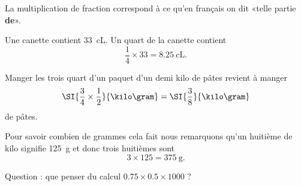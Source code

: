 \begin{Aretenir}
    La multiplication de fraction correspond à ce qu'en français on dit «telle partie {\bf de}».
\end{Aretenir}

\begin{example}
    Une canette contient \SI{33}{\centi\liter}. Un quart de la canette contient
    \begin{equation}
        \frac{1}{ 4 }\times 33 =\SI{8.25}{\centi\liter}.
    \end{equation}
\end{example}

\begin{example}
    Manger les trois quart d'un paquet d'un demi kilo de pâtes revient à manger
    \begin{equation}
        \SI{\frac{ 3 }{ 4 }\times \frac{1}{ 2 }}{\kilo\gram}=\SI{\frac{ 3 }{ 8 }}{\kilo\gram}
    \end{equation}
    de pâtes.

    Pour savoir combien de grammes cela fait nous remarquons qu'un huitième de kilo signifie \SI{125}{\gram} et donc trois huitièmes sont
    \begin{equation}
        3\times 125=\SI{375}{\gram}.
    \end{equation}

    Question : que penser du calcul \( 0.75\times 0.5\times 1000 \) ?
\end{example}
